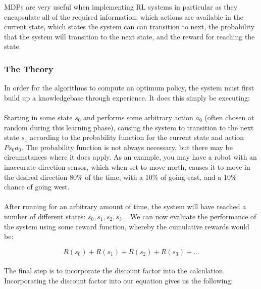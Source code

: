 \documentclass[a4paper,oneside]{report}
\begin{document}
MDPs are very useful when implementing RL systems in particular as they encapsulate all of the required information: which actions are available in the current state, which states the system can can transition to next, the probability that the system will transition to the next state, and the reward for reaching the state.

\subsubsection{The Theory} 

In order for the algorithms to compute an optimum policy, the system must first build up a knowledgebase through experience. It does this simply be executing:

\paragraph{} Starting in some state $s_0$ and performs some arbitrary action $a_0$ (often chosen at random during this learning phase), causing the system to transition to the next state $s_1$ according to the probability function for the current state and action $Ps_0a_0$. The probability function is not always necessary, but there may be circumstances where it does apply. As an example, you may have a robot with an inaccurate direction sensor, which when set to move north, causes it to move in the desired direction 80\% of the time, with a 10\% of going east, and a 10\% chance of going west.

\paragraph{} After running for an arbitrary amount of time, the system will have reached a number of different states: $s_0, s_1, s_2, s_3 ...$ We can now evaluate the performance of the system using some reward function, whereby the cumulative rewards would be:

\begin{equation*} 
	R(s_0) + R(s_1) + R(s_2) + R(s_3) + ...
\end{equation*}

\paragraph{} The final step is to incorporate the discount factor into the calculation. Incorporating the discount factor into our equation gives us the following: 
\end{document}
